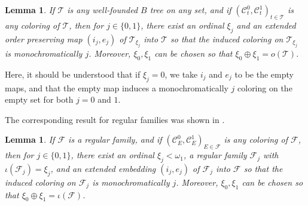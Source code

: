 \documentclass[12pt]{amsart}
\newtheorem{lemma}[theorem]{Lemma}
\theoremstyle{definition}
\newcommand{\ccc}{\mathcal{C}}
\newcommand{\fff}{\mathcal{F}}
\newcommand{\ttt}{\mathcal{T}}
\begin{document}
\begin{lemma} If $\ttt$ is any well-founded $B$ tree on any set, and if $(\ccc_t^0, \ccc_t^1)_{t\in \ttt}$ is any coloring of $\ttt$, then for $j\in \{0,1\}$, there exist an ordinal $\xi_j$ and an extended order preserving map $(i_j, e_j)$ of $\ttt_{\xi_j}$ into $\ttt$ so that the induced coloring on $\ttt_{\xi_j}$ is monochromatically $j$.  Moreover, $\xi_0, \xi_1$ can be chosen so that $\xi_0\oplus \xi_1=o(\ttt)$.  

\label{coloring sums}

\end{lemma}

Here, it should be understood that if $\xi_j=0$, we take $i_j$ and $e_j$ to be the empty maps, and that the empty map induces a monochromatically $j$ coloring on the empty set for both $j=0$ and $1$.  


The corresponding result for regular families was shown in \cite{Causey}.  

\begin{lemma} If $\fff$ is a regular family, and if $(\ccc^0_E, \ccc^1_E)_{E\in \fff}$ is any coloring of $\fff$, then for $j\in \{0,1\}$, there exist an ordinal $\xi_j<\omega_1$, a regular family $\fff_j$ with $\iota(\fff_j)=\xi_j$, and an extended embedding $(i_j, e_j)$ of $\fff_j$ into $\fff$ so that the induced coloring on $\fff_j$ is monochromatically $j$.  Moreover, $\xi_0, \xi_1$ can be chosen so that $\xi_0\oplus \xi_1=\iota(\fff)$.  


\end{lemma}
\end{document}
